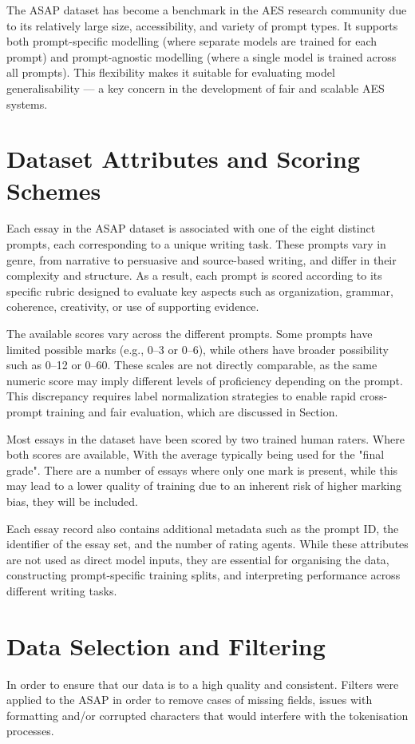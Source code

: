 \documentclass[12pt,a4paper]{report}
\begin{document}
The ASAP dataset has become a benchmark in the AES research community due to its relatively large size, accessibility, and variety of prompt types. It supports both prompt-specific modelling (where separate models are trained for each prompt) and prompt-agnostic 
modelling (where a single model is trained across all prompts). This flexibility makes it suitable for evaluating model generalisability — a key concern in the development of fair and scalable AES systems.

\section{Dataset Attributes and Scoring Schemes}
Each essay in the ASAP dataset is associated with one of the eight distinct prompts, each corresponding to a unique writing task. These prompts vary in genre, from narrative to persuasive and source-based writing, and differ in their complexity and structure. As a result, each prompt is scored according to its specific rubric designed to evaluate key aspects such as organization, grammar, coherence, creativity, or use of supporting evidence.

The available scores vary across the different prompts. Some prompts have limited possible marks (e.g., 0--3 or 0--6), while others have broader possibility such as 0--12 or 0--60. These scales are not directly comparable, as the same numeric score may imply different levels of proficiency depending on the prompt. This discrepancy requires label normalization strategies to enable rapid cross-prompt training and fair evaluation, which are discussed in Section.

Most essays in the dataset have been scored by two trained human raters. Where both scores are available, With the average typically being used for the "final grade". There are a number of essays where only one mark is present, while this may lead to a lower quality of training due to an inherent risk of higher marking bias, they will be included.

Each essay record also contains additional metadata such as the prompt ID, the identifier of the essay set, and the number of rating agents. While these attributes are not used as direct model inputs, they are essential for organising the data, constructing prompt-specific training splits, and interpreting performance across different writing tasks.

\section{Data Selection and Filtering}
In order to ensure that our data is to a high quality and consistent. Filters were applied to the ASAP in order to remove cases of missing fields, issues with formatting and/or corrupted characters that would interfere with the tokenisation processes.
\end{document}
